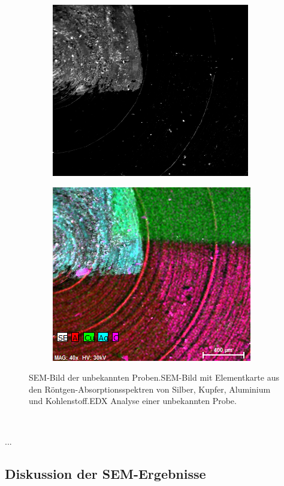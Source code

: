 \begin{figure}[H]
	\centering
	\begin{subfigure}[c]{.45\textwidth}
		\centering
		\includegraphics[width=.8\textwidth]{raw/SEM/Map4ProbenExt}
		\subcaption{}
	\end{subfigure}
	\begin{subfigure}[c]{.45\textwidth}
		\centering
		\includegraphics[width=.8\textwidth]{raw/SEM/Mapdaten4Proben}
		\subcaption{}
	\end{subfigure}
	\caption{SEM-Bild der unbekannten Proben.SEM-Bild mit Elementkarte aus den Röntgen-Absorptionsspektren von Silber, Kupfer, Aluminium und Kohlenstoff.EDX Analyse einer unbekannten Probe.} %
	\label{fig:elementalMap}
\end{figure}

	\

	...

\subsection{Diskussion der SEM-Ergebnisse}

